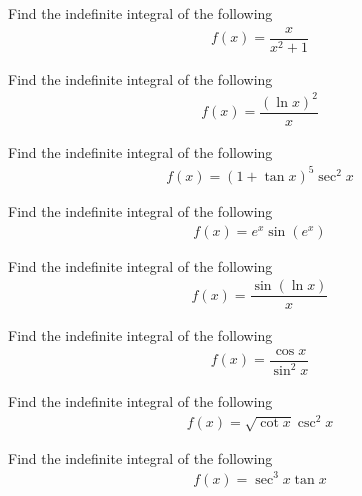 \begin{exercise}
Find the indefinite integral of the following 
\begin{align*}
    f(x) = \dfrac{x}{x^{2} + 1}
\end{align*}
\end{exercise}

\begin{exercise}
Find the indefinite integral of the following 
\begin{align*}
    f(x) = \dfrac{(\ln x)^{2}}{x}
\end{align*}
\end{exercise}

\begin{exercise}
Find the indefinite integral of the following 
\begin{align*}
    f(x) = (1 + \tan x)^{5} \sec^{2} x
\end{align*}
\end{exercise}

\begin{exercise}
Find the indefinite integral of the following 
\begin{align*}
    f(x) = e^{x} \sin (e^{x})
\end{align*}
\end{exercise}

\begin{exercise}
Find the indefinite integral of the following 
\begin{align*}
    f(x) = \dfrac{\sin(\ln x)}{x}
\end{align*}
\end{exercise}

\begin{exercise}
Find the indefinite integral of the following 
\begin{align*}
    f(x) = \dfrac{\cos x}{\sin^{2} x}
\end{align*}
\end{exercise}

\begin{exercise}
Find the indefinite integral of the following 
\begin{align*}
    f(x) = \sqrt{\cot x} \csc^{2} x
\end{align*}
\end{exercise}

\begin{exercise}
Find the indefinite integral of the following 
\begin{align*}
    f(x) = \sec^{3} x \tan x
\end{align*}
\end{exercise}

